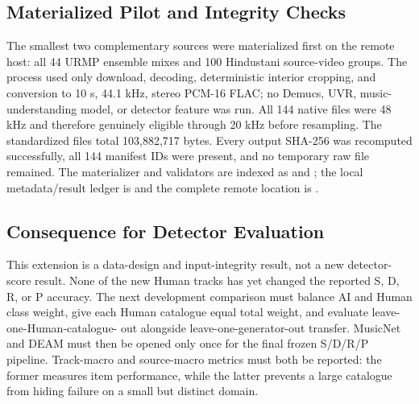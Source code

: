 \subsection{Materialized Pilot and Integrity Checks}

The smallest two complementary sources were materialized first on the remote host:
all 44 URMP ensemble mixes and 100 Hindustani source-video groups.  The process used
only download, decoding, deterministic interior cropping, and conversion to 10 s,
44.1 kHz, stereo PCM-16 FLAC; no Demucs, UVR, music-understanding model, or detector
feature was run.  All 144 native files were 48 kHz and therefore genuinely eligible
through 20 kHz before resampling.  The standardized files total 103,882,717 bytes.
Every output SHA-256 was recomputed successfully, all 144 manifest IDs were present,
and no temporary raw file remained.  The materializer and validators are indexed as
 and ; the local metadata/result ledger is 
and the complete remote location is .

\subsection{Consequence for Detector Evaluation}

This extension is a data-design and input-integrity result, not a new detector-score
result.  None of the new Human tracks has yet changed the reported S, D, R, or P
accuracy.  The next development comparison must balance AI and Human class weight,
give each Human catalogue equal total weight, and evaluate leave-one-Human-catalogue-
out alongside leave-one-generator-out transfer.  MusicNet and DEAM must then be
opened only once for the final frozen S/D/R/P pipeline.  Track-macro and source-macro
metrics must both be reported: the former measures item performance, while the latter
prevents a large catalogue from hiding failure on a small but distinct domain.
